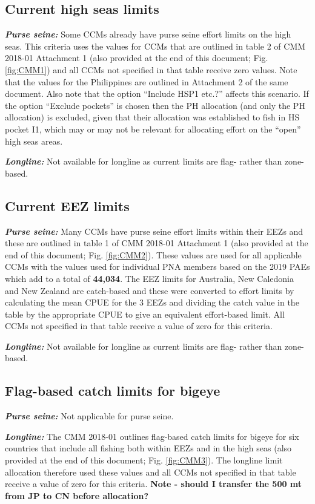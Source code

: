 \documentclass[11pt]{article}
\begin{document}
\subsection*{Current high seas limits}
\noindent\textbf{\emph{Purse seine:}}
Some CCMs already have purse seine effort limits on the high seas. This criteria uses the values for CCMs that are outlined in table 2 of CMM 2018-01 Attachment 1  (also provided at the end of this document; Fig. \ref{fig:CMM1}) and all CCMs not specified in that table receive zero values. Note that the values for the Philippines are outlined in Attachment 2 of the same document. Also note that the option ``Include HSP1 etc.?'' affects this scenario. If the option ``Exclude pockets'' is chosen then the PH allocation (and only the PH allocation) is excluded, given that their allocation was established to fish in HS pocket I1, which may or may not be relevant for allocating effort on the ``open'' high seas areas.

\noindent\textbf{\emph{Longline:}}
Not available for longline as current limits are flag- rather than zone-based.

\subsection*{Current EEZ limits}
\noindent\textbf{\emph{Purse seine:}}
Many CCMs have purse seine effort limits within their EEZs and these are outlined in table 1 of CMM 2018-01 Attachment 1  (also provided at the end of this document; Fig. \ref{fig:CMM2}). These values are used for all applicable CCMs with the values used for individual PNA members based on the 2019 PAEs which add to a total of {\bf 44,034}. The EEZ limits for Australia, New Caledonia and New Zealand are catch-based and these were converted to effort limits by calculating the mean CPUE for the 3 EEZs and dividing the catch value in the table by the appropriate CPUE to give an equivalent effort-based limit. All CCMs not specified in that table receive a value of zero for this criteria.

\noindent\textbf{\emph{Longline:}}
Not available for longline as current limits are flag- rather than zone-based.

\subsection*{Flag-based catch limits for bigeye}
\noindent\textbf{\emph{Purse seine:}}
Not applicable for purse seine.

\noindent\textbf{\emph{Longline:}}
The CMM 2018-01 outlines flag-based catch limits for bigeye for six countries that include all fishing both within EEZs and in the high seas (also provided at the end of this document; Fig. \ref{fig:CMM3}). The longline limit allocation therefore used these values and all CCMs not specified in that table receive a value of zero for this criteria. {\bf Note - should I transfer the 500 mt from JP to CN before allocation?}
\end{document}
